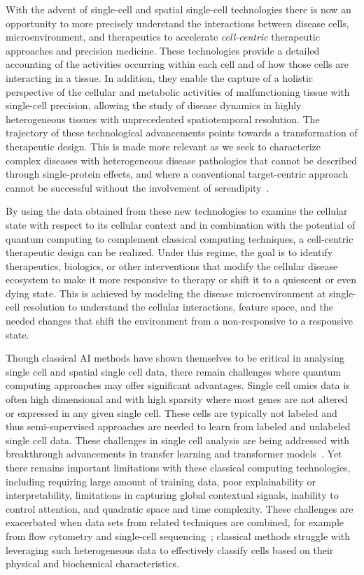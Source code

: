 \documentclass{article}
\begin{document}
With the advent of single-cell and spatial single-cell technologies there is now an opportunity to more precisely understand the interactions between disease cells, microenvironment, and therapeutics to accelerate \textit{cell-centric} therapeutic approaches and precision medicine. These technologies provide a detailed accounting of the activities occurring within each cell and of how those cells are interacting in a tissue. In addition, they enable the capture of a holistic perspective of the cellular and metabolic activities of malfunctioning tissue with single-cell precision, allowing the study of disease dynamics in highly heterogeneous tissues with unprecedented spatiotemporal resolution. The trajectory of these technological advancements points towards a transformation of therapeutic design. This is made more relevant as we seek to characterize complex diseases with heterogeneous disease pathologies that cannot be described through single-protein effects, and where a conventional target-centric approach cannot be successful without the involvement of serendipity~\cite{hargrave2012serendipity}.

By using the data obtained from these new technologies to examine the cellular state with respect to its cellular context and in combination with the potential of quantum computing to complement classical computing techniques, a cell-centric therapeutic design can be realized. Under this regime, the goal is to identify therapeutics, biologics, or other interventions that modify the cellular disease ecosystem to make it more responsive to therapy or shift it to a quiescent or even dying state. This is achieved by modeling the disease  microenvironment at single-cell resolution to understand the cellular interactions, feature space, and the needed changes that shift the environment from a non-responsive to a responsive state. 

Though classical AI methods have shown themselves to be critical in analysing single cell and spatial single cell data, there remain challenges where quantum computing approaches may offer significant advantages. Single cell omics data is often high dimensional and with high sparsity where most genes are not altered or expressed in any given single cell. These cells are typically not labeled and thus semi-supervised approaches are needed to learn from labeled and unlabeled single cell data. These challenges in single cell analysis are being addressed with breakthrough advancements in transfer learning and transformer models~\cite{Chen2023, Theodoris2023, Cui2023, Hao2023}. Yet there remains important limitations with these classical computing technologies, including requiring large amount of training data, poor explainability or interpretability, limitations in capturing global contextual signals, inability to control attention, and quadratic space and time complexity. 
These challenges are exacerbated when data sets from related techniques are combined, for example from flow cytometry and single-cell sequencing~\cite{andreyev2020integration}; classical methods struggle with leveraging such heterogeneous data to effectively classify cells based on their physical and biochemical characteristics.
\end{document}
